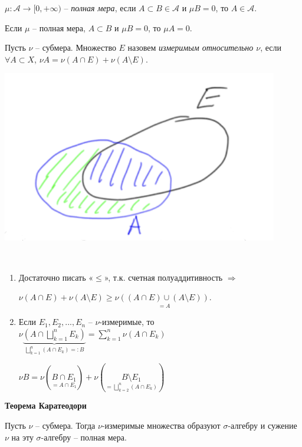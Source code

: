 \begin{definition}
    $\mu: \mathcal{A}\rightarrow [0, +\infty)$ – \textit{полная мера}, если $A\subset B \in \mathcal{A}$ и $\mu B=0$, 
    то $A\in \mathcal{A}$.
\end{definition}

\begin{remark}
    Если $\mu$ – полная мера, $A\subset B$ и $\mu B = 0$, то $\mu A = 0$.
\end{remark}

\begin{definition}
    Пусть $\nu$ – субмера. Множество $E$ назовем \textit{измеримым относительно $\nu$}, если $\forall A\subset X$, $\nu A = \nu (A\cap E) + \nu (A\setminus E)$.
\end{definition}

\includegraphics[width=0.2\linewidth]{images/23-09-14-1.png}

\begin{remark}~
    \begin{enumerate}
        \item Достаточно писать «$\leq$», т.к. счетная полуаддитивность $\Rightarrow $
        
        $\nu (A\cap E) + \nu (A\setminus E)\geq \nu \underset{=A}{((A\cap E) \cup (A\setminus E))}$.
        \item Если $E_1, E_2, ..., E_n$ – $\nu$-измеримые, то $\nu \underbrace{(A\cap \bigsqcup\limits_{k=1}^n E_k)}_{\bigsqcup\limits_{k=1}^n(A\cap E_k)=:B}=\sum\limits_{k=1}^n \nu (A\cap E_k)$

        $\nu B = \nu (\underset{=A\cap E_1}{B\cap E_1})+ \nu (\underset{=\bigsqcup\limits_{k=2}^n(A\cap E_k)}{B\setminus E_1})$
    \end{enumerate}
\end{remark}

\begin{theorem}
    \textbf{Теорема Каратеодори}

    Пусть $\nu$ – субмера. Тогда $\nu$-измеримые множества образуют $\sigma$-алгебру и сужение $\nu$ на эту 
    $\sigma$-алгебру – полная мера.
\end{theorem}

